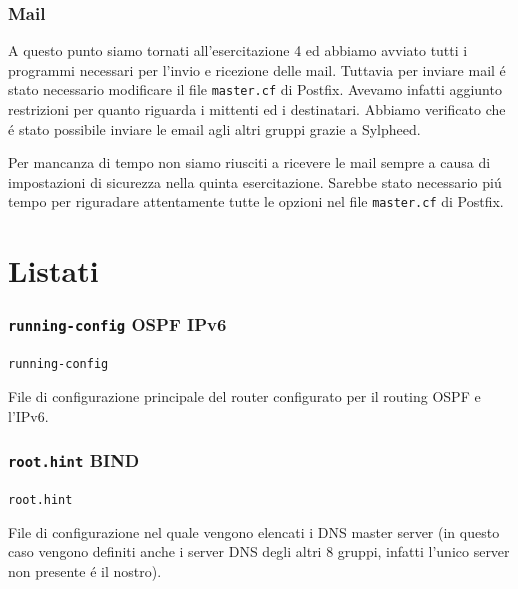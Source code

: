 \documentclass[9pt, a4paper, oneside]{article}
\begin{document}
		\section{Mail}
			\par
				A questo punto siamo tornati all'esercitazione 
				4 ed abbiamo avviato tutti i programmi 
				necessari per l'invio e ricezione delle mail. 
				Tuttavia per inviare mail \'e stato necessario 
				modificare il file \texttt{master.cf} di 
				Postfix. Avevamo infatti aggiunto restrizioni 
				per quanto riguarda i mittenti ed i 
				destinatari. Abbiamo verificato che \'e stato 
				possibile inviare le email agli altri gruppi 
				grazie a Sylpheed.
			\par
				Per mancanza di tempo non siamo riusciti a 
				ricevere le mail sempre a causa di 
				impostazioni di sicurezza nella quinta 
				esercitazione. Sarebbe stato necessario pi\'u 
				tempo per riguradare attentamente tutte le 
				opzioni nel file \texttt{master.cf} di Postfix.
		\newpage
	\part{Listati}	
		 \par		
		 \section{\texttt{running-config} OSPF IPv6}
			\par
				\texttt{running-config}
			\par
				File di configurazione principale del router 
				configurato per il routing OSPF e l'IPv6.
			\texttt{}
			\newpage
		\section{\texttt{root.hint} BIND}
			\par
			 	\texttt{root.hint}
			\par
				File di configurazione nel quale vengono 
				elencati i DNS master server (in questo caso 
				vengono definiti anche i server DNS degli 
				altri 8 gruppi, infatti l'unico server non 
				presente \'e il nostro). 	
			\texttt{}
\end{document}
